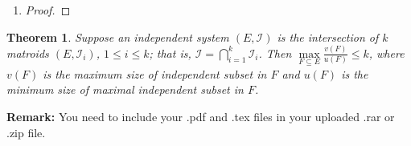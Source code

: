 \documentclass[12pt,a4paper]{article}
\makeatletter
\newtheorem{theorem}{Theorem}
\newtheorem*{solution}{Solution}
\theoremstyle{definition}
\renewenvironment{solution}[1][Solution] {\par\pushQED{\qed}\normalfont\topsep6\p@\@plus6\p@\relax\trivlist\item[\hskip\labelsep\bfseries#1\@addpunct{.}]\ignorespaces}{\popQED\endtrivlist\@endpefalse} \makeatother
\makeatother
\begin{document}
\begin{enumerate}
\begin{enumerate}
\begin{solution}
\begin{enumerate}
\begin{proof}
					\end{proof}
				\end{enumerate}
    	    \end{solution}
    \end{enumerate}
    \begin{theorem} \label{Thm-Intersect}
        Suppose an independent system $(E, \mathcal{I})$ is the intersection of $k$ matroids $\left(E, \mathcal{I}_{i}\right)$, $1 \leq i \leq k$; that is, $\mathcal{I}=\bigcap_{i=1}^{k} \mathcal{I}_{i}$. Then $\max\limits_{F \subseteq E} \frac{v(F)}{u(F)} \leq k$, where $v(F)$ is the maximum size of independent subset in $F$ and $u(F)$ is the minimum size of maximal independent subset in $F$.
    \end{theorem}    
\end{enumerate}

\vspace{20pt}

\textbf{Remark:} You need to include your .pdf and .tex files in your uploaded .rar or .zip file.

\end{document}
